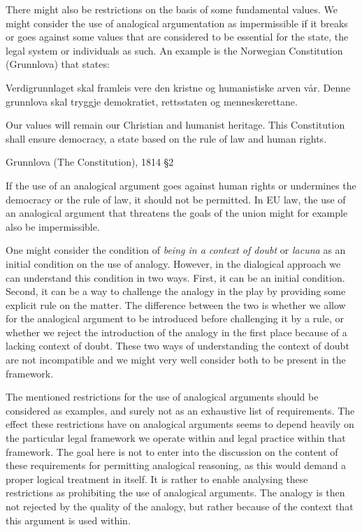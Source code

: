 				There might also be restrictions on the basis of some fundamental values. We might consider the use of analogical argumentation as impermissible if it breaks or goes against some values that are considered to be essential for the state, the legal system or individuals as such. An example is the Norwegian Constitution (Grunnlova) that states:
					\begin{itquote}
						Verdigrunnlaget skal framleis vere den kristne og humanistiske arven vår. Denne grunnlova skal tryggje demokratiet, rettsstaten og menneskerettane.
					\end{itquote}
					\begin{displayquote}
						Our values will remain our Christian and humanist heritage. This Constitution shall ensure democracy, a state based on the rule of law and human rights.
					\end{displayquote}
					\hfill Grunnlova (The Constitution), 1814 \S 2 \medskip
			
				If the use of an analogical argument goes against human rights or undermines the democracy or the rule of law, it should not be permitted. In EU law, the use of an analogical argument that threatens the goals of the union might for example also be impermissible. 
				
				One might consider the condition of \textit{being in a context of doubt} or \textit{lacuna} as an initial condition on the use of analogy. However, in the dialogical approach we can understand this condition in two ways. First, it can be an initial condition. Second, it can be a way to challenge the analogy in the play by providing some explicit rule on the matter. The difference between the two is whether we allow for the analogical argument to be introduced before challenging it by a rule, or whether we reject the introduction of the analogy in the first place because of a lacking context of doubt. These two ways of understanding the context of doubt are not incompatible and we might very well consider both to be present in the framework.
				
				The mentioned restrictions for the use of analogical arguments should be considered as examples, and surely not as an exhaustive list of requirements. The effect these restrictions have on analogical arguments seems to depend heavily on the particular legal framework we operate within and legal practice within that framework. The goal here is not to enter into the discussion on the content of these requirements for permitting analogical reasoning, as this would demand a proper logical treatment in itself. It is rather to enable analysing these restrictions as prohibiting the use of analogical arguments. The analogy is then not rejected by the quality of the analogy, but rather because of the context that this argument is used within. 
				
